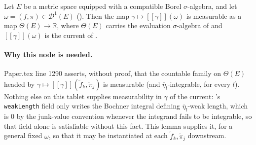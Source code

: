 \begin{lemma}
  Let $E$ be a metric space equipped with a compatible Borel $\sigma$-algebra, and let
  $\omega = (f,\pi) \in \mathcal{D}^1(E)$ (). Then the map
  $\gamma \mapsto [[\gamma]](\omega)$ is measurable as a map $\Theta(E) \to \mathbb{R}$, where
  $\Theta(E)$ carries the evaluation $\sigma$-algebra of  and
  $[[\gamma]](\omega)$ is the current of .

  \paragraph{Why this node is needed.} Paper.tex line 1290 asserts, without proof, that the
  countable family on $\Theta(E)$ headed by $\gamma \mapsto [[\gamma]](\tilde f_k,\tilde\pi_j)$
  is measurable (and $\overline\eta_l$-integrable, for every $l$). Nothing else on this tablet
  supplies measurability in $\gamma$ of the current: 's \texttt{weakLength} field
  only writes the Bochner integral defining $\overline\eta_l$-weak length, which is $0$ by the
  junk-value convention whenever the integrand fails to be integrable, so that field alone is
  satisfiable without this fact. This lemma supplies it, for a general fixed $\omega$, so that it
  may be instantiated at each $\tilde f_k,\tilde\pi_j$ downstream.
\end{lemma}
